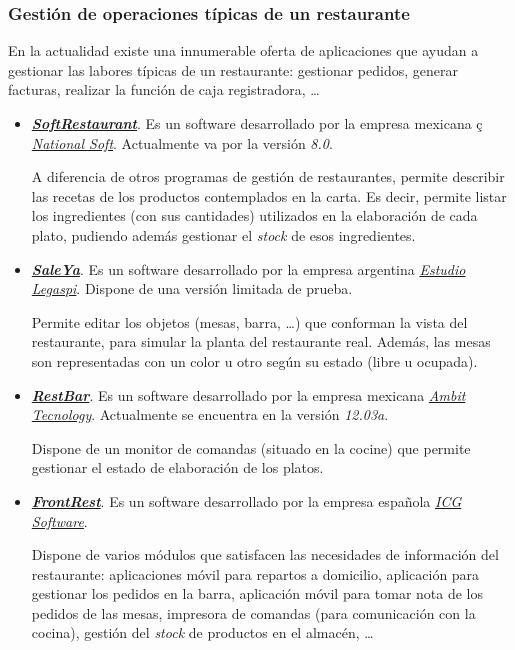     \subsubsection{Gestión de operaciones típicas de un restaurante}
    En la actualidad existe una innumerable oferta de aplicaciones que ayudan
    a gestionar las labores típicas de un restaurante: gestionar pedidos,
    generar facturas, realizar la función de caja registradora, \dots
      \begin{itemize}
      \item \emph{\textbf{\href{http://www.softrestaurant.com/}
      {SoftRestaurant}}}. Es un software desarrollado por la empresa mexicana ç
      \emph{\href{http://www.nationalsoft.com.mx/}{National Soft}}.
      Actualmente va por la versión \emph{8.0}.


      A diferencia de otros programas de gestión de restaurantes, permite
      describir las recetas de los productos contemplados en la carta. Es 
      decir, permite listar los ingredientes (con sus cantidades) utilizados
      en la elaboración de cada plato, pudiendo además gestionar el
      \emph{stock} de esos ingredientes.

      \item \emph{\textbf{\href{http://www.estudiolegaspi.com.ar/Salewin.html}
      {SaleYa}}}. Es un software desarrollado por la empresa argentina 
      \emph{\href{http://www.estudiolegaspi.com.ar/}{Estudio Legaspi}}.
      Dispone de una versión limitada de prueba.


      Permite editar los objetos (mesas, barra, \dots) que conforman la vista 
      del restaurante, para simular la planta del restaurante real. Además, las
      mesas son representadas con un color u otro según su estado (libre u
      ocupada).

      \item \emph{\textbf{\href{http://www.restbar.com/}{RestBar}}}. Es un
      software desarrollado por la empresa mexicana
      \emph{\href{http://www.ambit.com.mx/}{Ambit Tecnology}}. Actualmente se
      encuentra en la versión \emph{12.03a}.


      Dispone de un monitor de comandas (situado en la cocine) que permite
      gestionar el estado de elaboración de los platos.

      \item \emph{\textbf{
      \href{http://www.icg.es/?es/software-programas/restaurantes-hosteleria}
      {FrontRest}}}. Es un software desarrollado por la empresa española
      \emph{\href{http://www.icg.es}{ICG Software}}.

      Dispone de varios módulos que satisfacen las necesidades de información
      del restaurante: aplicaciones móvil para repartos a domicilio, aplicación
      para gestionar los pedidos en la barra, aplicación móvil para tomar nota
      de los pedidos de las mesas, impresora de comandas (para comunicación 
      con la cocina), gestión del \emph{stock} de productos en el almacén, 
      \dots
      \end{itemize} 
